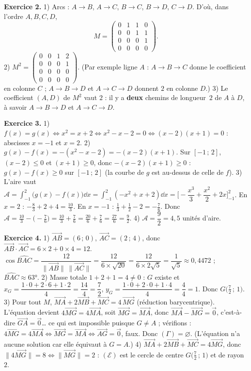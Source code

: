 \noindent\textbf{Exercice 2.}
1) Arcs : $A\to B$, $A\to C$, $B\to C$, $B\to D$, $C\to D$. D'où, dans l'ordre $A,B,C,D$,
$$M=\begin{pmatrix}0&1&1&0\\0&0&1&1\\0&0&0&1\\0&0&0&0\end{pmatrix}.$$
2) $M^2=\begin{pmatrix}0&0&1&2\\0&0&0&1\\0&0&0&0\\0&0&0&0\end{pmatrix}$.
(Par exemple ligne $A$ : $A\to B\to C$ donne le coefficient en colonne $C$ ; $A\to B\to D$
et $A\to C\to D$ donnent $2$ en colonne $D$.)
3) Le coefficient $(A,D)$ de $M^2$ vaut $2$ : il y a \textbf{deux} chemins de longueur~$2$
de $A$ à $D$, à savoir $A\to B\to D$ et $A\to C\to D$.

\noindent\textbf{Exercice 3.}
1) $f(x)=g(x) \iff x^2=x+2 \iff x^2-x-2=0 \iff (x-2)(x+1)=0$ : abscisses $x=-1$ et $x=2$.
2) $g(x)-f(x)=-(x^2-x-2)=-(x-2)(x+1)$. Sur $[-1\,;\,2]$, $(x-2)\le0$ et $(x+1)\ge0$, donc
$-(x-2)(x+1)\ge0$ : $g(x)-f(x)\ge0$ sur $[-1\,;\,2]$ (la courbe de $g$ est au-dessus de
celle de $f$).
3) L'aire vaut $\mathcal{A}=\displaystyle\int_{-1}^{2}\big(g(x)-f(x)\big)\dd x
=\int_{-1}^{2}(-x^2+x+2)\dd x
=\Big[-\dfrac{x^3}{3}+\dfrac{x^2}{2}+2x\Big]_{-1}^{2}$.
En $x=2$ : $-\tfrac83+2+4=\tfrac{10}{3}$. En $x=-1$ : $\tfrac13+\tfrac12-2=-\tfrac76$.
Donc $\mathcal{A}=\tfrac{10}{3}-\big(-\tfrac76\big)=\tfrac{10}{3}+\tfrac76=\tfrac{20}{6}+\tfrac{7}{6}=\tfrac{27}{6}=\tfrac92$.
4) $\mathcal{A}=\dfrac{9}{2}=4{,}5$ unités d'aire.

\noindent\textbf{Exercice 4.}
1) $\vec{AB}=(6\,;\,0)$, $\vec{AC}=(2\,;\,4)$, donc $\vec{AB}\cdot\vec{AC}=6\times2+0\times4=12$.
$\cos\widehat{BAC}=\dfrac{12}{\|\vec{AB}\|\,\|\vec{AC}\|}=\dfrac{12}{6\times\sqrt{20}}
=\dfrac{12}{6\times2\sqrt5}=\dfrac{1}{\sqrt5}\approx0{,}4472$ ; $\widehat{BAC}\approx63°$.
2) Masse totale $1+2+1=4\neq0$ : $G$ existe et
$x_G=\dfrac{1\cdot0+2\cdot6+1\cdot2}{4}=\dfrac{14}{4}=\dfrac72$,
$y_G=\dfrac{1\cdot0+2\cdot0+1\cdot4}{4}=\dfrac{4}{4}=1$. Donc $G\big(\tfrac72\,;\,1\big)$.
3) Pour tout $M$, $\vec{MA}+2\vec{MB}+\vec{MC}=4\,\vec{MG}$ (réduction barycentrique).
L'équation devient $4\vec{MG}=4\vec{MA}$, soit $\vec{MG}=\vec{MA}$, donc $\vec{MA}-\vec{MG}=\vec0$,
c'est-à-dire $\vec{GA}=\vec0$… ce qui est impossible puisque $G\neq A$ ; vérifions :
$4\vec{MG}=4\vec{MA}\iff \vec{MG}=\vec{MA}\iff \vec{AG}=\vec0$, faux. Donc $(\Gamma)=\varnothing$.
(L'équation n'a aucune solution car elle équivaut à $G=A$.)
4) $\vec{MA}+2\vec{MB}+\vec{MC}=4\vec{MG}$, donc $\|4\vec{MG}\|=8 \iff \|\vec{MG}\|=2$ :
$(\mathcal{E})$ est le cercle de centre $G\big(\tfrac72\,;\,1\big)$ et de rayon~$2$.

